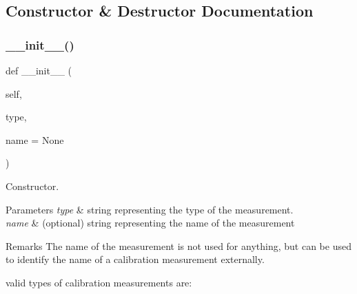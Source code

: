 \subsection{Constructor \& Destructor Documentation}
\mbox{\label{classSignalIntegrity_1_1Measurement_1_1Calibration_1_1CalibrationMeasurements_1_1CalibrationMeasurement_a1ddf400813e458d6de6ee54246f050e7}} 
\subsubsection{\texorpdfstring{\+\_\+\+\_\+init\+\_\+\+\_\+()}{\_\_init\_\_()}}
{\footnotesize\ttfamily def \+\_\+\+\_\+init\+\_\+\+\_\+ (\begin{DoxyParamCaption}\item[{}]{self,  }\item[{}]{type,  }\item[{}]{name = {\ttfamily None} }\end{DoxyParamCaption})}



Constructor. 


\begin{DoxyParams}{Parameters}
{\em type} & string representing the type of the measurement. \\
\hline
{\em name} & (optional) string representing the name of the measurement \\
\hline
\end{DoxyParams}
\begin{DoxyRemark}{Remarks}
The name of the measurement is not used for anything, but can be used to identify the name of a calibration measurement externally.
\end{DoxyRemark}
valid types of calibration measurements are\+:


